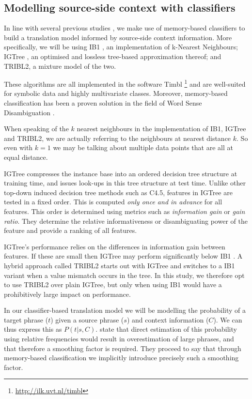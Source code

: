 \documentclass[smallextended]{svjour3}       %
\theoremstyle{break}
\begin{document}
\subsection{Modelling source-side context with classifiers}

In line with several previous studies \citep{Rejwanul+11,PBMBMT,
Stroppa+07,MARKERBASED}, we make use of memory-based classifiers to build a
translation model informed by source-side context information. More
specifically, we will be using IB1 \citep{IB1}, an implementation of k-Nearest
Neighbours; IGTree \citep{IGTree}, an optimised and lossless tree-based approximation thereof;
and TRIBL2, a mixture model of the two. 

These algorithms are all implemented in the
software Timbl \citep{TIMBL}\footnote{\url{http://ilk.uvt.nl/timbl}} and
are well-suited for symbolic data and highly multivariate classes.
Moreover, memory-based classification has been a proven solution in the field
of Word Sense Disambiguation \citep{SENSEVAL2,WSD2}.

When speaking of the $k$ nearest neighbours in the implementation of IB1,
IGTree and TRIBL2, we are actually referring to the neighbours at nearest
distance $k$. So even with $k=1$ we may be talking about multiple data points
that are all at equal distance.

IGTree compresses the instance base into an ordered decision tree structure at
training time, and issues look-ups in this tree structure at test time. Unlike
other top-down induced decision tree methods such as C4.5, features in IGTree
are tested in a fixed order. This is computed \emph{only once and in advance}
for all features. This order is determined using metrics such as
\emph{information gain} or \emph{gain ratio}. They determine the relative
informativeness or disambiguating power of the feature and provide a ranking of
all features. 

IGTree's performance relies on the differences in information gain between
features. If these are small then IGTree may perform significantly below IB1
\citep{TIMBL}. A hybrid approach called TRIBL2 \citep{TIMBL} starts out with
IGTree and switches to a IB1 variant when a value mismatch occurs in the tree.
In this study, we therefore opt to use TRIBL2 over plain IGTree, but only when
using IB1 would have a prohibitively large impact on performance.

In our classifier-based translation model we will be modelling the probability
of a target phrase ($t$) given a source phrase ($s$) and context information
($C$). We can thus express this as $P(t|s,C)$.  \cite{Stroppa+07} state that
direct estimation of this probability using relative frequencies would result
in overestimation of large phrases, and that therefore a smoothing factor is
required. They proceed to say that through memory-based classification we
implicitly introduce precisely such a smoothing factor.
\end{document}
